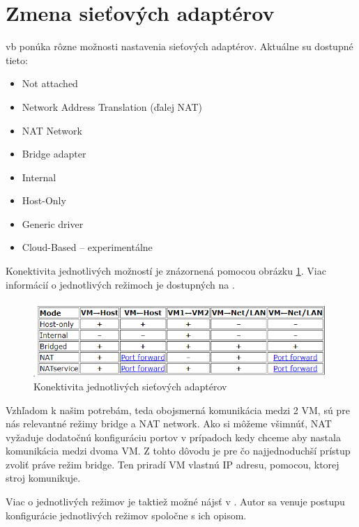 \section{Zmena sieťových adaptérov}
\acrshort{vb} ponúka rôzne možnosti nastavenia sieťových adaptérov. Aktuálne su dostupné tieto:
\begin{itemize}
	\item{Not attached}
	\item{Network Address Translation (ďalej NAT)}
	\item{NAT Network}
	\item{Bridge adapter}
	\item{Internal}
	\item{Host-Only}
	\item{Generic driver}
	\item{Cloud-Based} -- experimentálne
\end{itemize} 
 
Konektivita jednotlivých možností je znázornená pomocou obrázku \ref{vbmode}. Viac informácií o jednotlivých režimoch je dostupných na \cite{vboracle}.

\begin{figure}
	\centering
	\includegraphics[width=.9\textwidth]{figures/vbmodes}
	\caption{Konektivita jednotlivých sieťových adaptérov}
	\label{vbmode}
\end{figure}
Vzhľadom k našim potrebám, teda obojsmerná komunikácia medzi 2 VM, sú pre nás relevantné režimy bridge a NAT network. Ako si môžeme všimnúť, NAT vyžaduje dodatočnú konfiguráciu portov v prípadoch kedy chceme aby nastala komunikácia medzi dvoma VM. Z tohto dôvodu je pre čo najjednoduchší prístup zvoliť práve režim bridge. Ten priradí VM vlastnú IP adresu, pomocou, ktorej stroj komunikuje. 

Viac o jednotlivých režimov je taktiež možné nájsť v \cite{vbguide}. Autor sa venuje postupu konfigurácie jednotlivých režimov spoločne s ich opisom.
   
